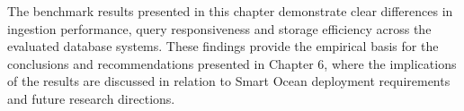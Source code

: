 The benchmark results presented in this chapter demonstrate clear differences in ingestion performance, query responsiveness and storage efficiency across the evaluated database systems. These findings provide the empirical basis for the conclusions and recommendations presented in Chapter 6, where the implications of the results are discussed in relation to Smart Ocean deployment requirements and future research directions.







